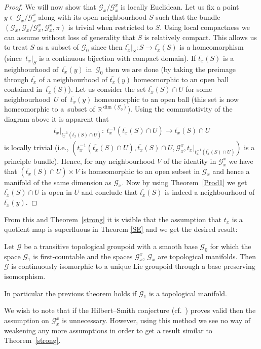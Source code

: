 \begin{proof}
We will now show that $\mathcal{G}_x\slash\mathcal{G}_x^x$ is locally Euclidean. Let us fix a point $y\in\mathcal{G}_x\slash\mathcal{G}_x^x$ along with its open neighbourhood $S$ such that the bundle $(\mathcal{G}_x,\mathcal{G}_x\slash\mathcal{G}_x^x,\mathcal{G}_x^x,\pi)$ is trivial when restricted to $S$. Using local compactness we can assume without loss of generality that $S$ is relatively compact. This allows us to treat $S$ as a subset of $\mathcal{G}_0$ since then $\overline{t_x}|_S\colon S\rightarrow\overline{t_x}(S)$ is a homeomorphism (since~$\overline{t_x}|_{\overline{S}}$ is a continuous bijection with compact domain). If $\overline{t_x}(S)$ is a neighbourhood of~$\overline{t_x}(y)$ in~$\mathcal{G}_0$ then we are done (by taking the preimage through $\overline{t_x}$ of a neighbourhood of $\overline{t_x}(y)$ homeomorphic to an open ball contained in~$\overline{t_x}(S)$). Let us consider the set $\overline{t_x}(S)\cap U$ for some neighbourhood~$U$ of~$\overline{t_x}(y)$ homeomorphic to an open ball (this set is now homeomorphic to a~subset of $\mathbb{R}^{\dim(\mathcal{G}_0)}$). Using the commutativity of the diagram above it is apparent that
\begin{gather*}
t_x|_{t_x^{-1}(\overline{t_x}(S)\cap U)}\colon \ t_x^{-1}(\overline{t_x}(S)\cap U)\rightarrow \overline{t_x}(S)\cap U
\end{gather*}
is locally trivial (i.e., $(t_x^{-1}(\overline{t_x}(S)\cap U),\overline{t_x}(S)\cap U,\mathcal{G}^x_x,t_x|_{t_x^{-1}(\overline{t_x}(S)\cap U)})$ is a principle bundle). Hence, for any neighbourhood $V$ of the identity in $\mathcal{G}^x_x$ we have that $(\overline{t_x}(S)\cap U)\times V$ is homeomorphic to an open subset in $\mathcal{G}_x$ and hence a manifold of the same dimension as $\mathcal{G}_x$. Now by using Theorem~\ref{Prod1} we get $\overline{t_x}(S)\cap U$ is open in $U$ and conclude that $\overline{t_x}(S)$ is indeed a neighbourhood of $\overline{t_x}(y)$.
\end{proof}

From this and Theorem~\ref{strong} it is visible that the assumption that $t_x$ is a quotient map is superfluous in Theorem \ref{SE} and we get the desired result:
\begin{tw}\label{H5S} Let $\mathcal{G}$ be a transitive topological groupoid with a smooth base $\mathcal{G}_0$ for which the space $\mathcal{G}_1$ is first-countable and the spaces $\mathcal{G}_x^x$, $\mathcal{G}_x$ are topological manifolds. Then $\mathcal{G}$ is continuously isomorphic to a unique Lie groupoid through a base preserving isomorphism.
\end{tw}

\begin{rem} In particular the previous theorem holds if $\mathcal{G}_1$ is a topological manifold.
\end{rem}
\begin{rem} We wish to note that if the Hilbert--Smith conjecture (cf.~\cite{TT}) proves valid then the assumption on $\mathcal{G}_x^x$ is unnecessary. However, using this method we see no way of weakening any more assumptions in order to get a result similar to Theorem~\ref{strong}.
\end{rem}
